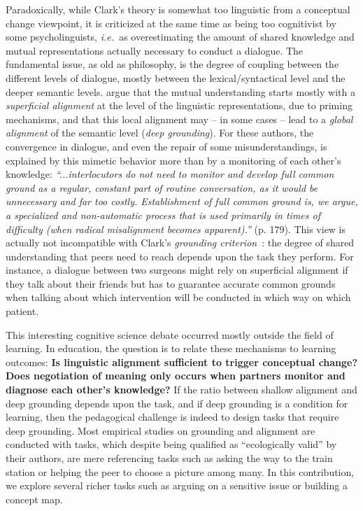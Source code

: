 \documentclass[natbib]{svjour3}
\newcommand{\ie}{{\textit{i.e.\ }}}
\begin{document}
Paradoxically, while Clark's theory is somewhat too linguistic from a conceptual
change viewpoint, it is criticized at the same time as being too cognitivist by
some psycholinguists, \ie as overestimating the amount of shared knowledge and
mutual representations actually necessary to conduct a dialogue. The fundamental
issue, as old as philosophy, is the degree of coupling between the different
levels of dialogue, mostly between the lexical/syntactical level and the deeper
semantic levels. \citet{pickering2006alignment} argue that the mutual
understanding starts mostly with a \emph{superficial alignment} at the level of
the linguistic representations, due to priming mechanisms, and that this local
alignment may -- in some cases -- lead to a \emph{global alignment} of the
semantic level (\emph{deep grounding}).  For these authors, the convergence in
dialogue, and even the repair of some misunderstandings, is explained by this
mimetic behavior more than by a monitoring of each other's knowledge:
\emph{``...interlocutors do not need to monitor and develop full common ground
as a regular, constant part of routine conversation, as it would be
unnecessary and far too costly. Establishment of full common ground is, we
argue, a specialized and non-automatic process that is used primarily in
times of difficulty (when radical misalignment becomes apparent).''} (p. 179).
This view is actually not incompatible with Clark's \emph{grounding
criterion}~\citep{clark1989contributing}: the degree of shared understanding that
peers need to reach depends upon the task they perform. For instance, a dialogue
between two surgeons might rely on superficial alignment if they talk about
their friends but has to guarantee accurate common grounds when talking about
which intervention will be conducted in which way on which patient. 

This interesting cognitive science debate occurred mostly outside the field of
learning. In education, the question is to relate these mechanisms to learning
outcomes: \textbf{Is linguistic alignment sufficient to trigger conceptual
change?} \textbf{Does negotiation of meaning only occurs when partners monitor
and diagnose each other's knowledge?} If the ratio between shallow alignment and
deep grounding depends upon the task, and if deep grounding is a condition for
learning, then the pedagogical challenge is indeed to design tasks that require
deep grounding. Most empirical studies on grounding and alignment are conducted
with tasks, which despite being qualified as ``ecologically valid'' by their
authors, are mere referencing tasks such as asking the way to the train station
or helping the peer to choose a picture among many. In this contribution, we
explore several richer tasks such as arguing on a sensitive issue or building a
concept map.  
\end{document}
